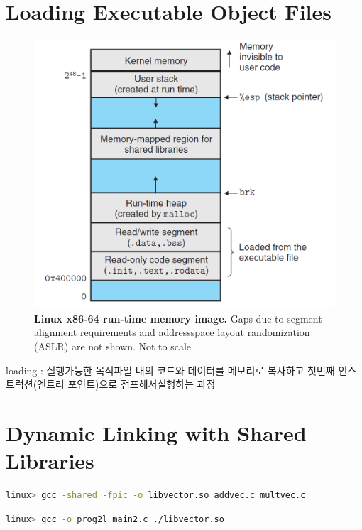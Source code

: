 \begin{itemize}
\section{Loading Executable Object Files}

\begin{figure}[h!]
    \centering
    \includegraphics[scale=0.5]{pic/section7/pic5.png}
    \caption{\textbf{Linux x86-64 run-time memory image.} 
    Gaps due to segment alignment requirements and addressspace layout randomization (ASLR) are not shown. Not to scale}
\end{figure}

loading : 실행가능한 목적파일 내의 코드와 데이터를 메모리로 복사하고 첫번째 인스트럭션(엔트리 포인트)으로 점프해서실행하는 과정

\section{Dynamic Linking with Shared Libraries}

\begin{lstlisting}[language=bash]
linux> gcc -shared -fpic -o libvector.so addvec.c multvec.c
\end{lstlisting}

\begin{lstlisting}[language=bash]
    linux> gcc -o prog2l main2.c ./libvector.so
\end{lstlisting}


\end{itemize}
